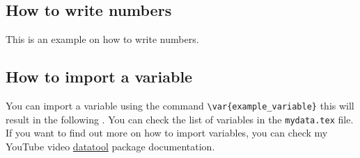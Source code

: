 \subsection{How to write numbers}\label{subsec:how-to-write-numbers}
This is an example on how to write numbers.

\subsection{How to import a variable}\label{subsec:how-to-import-a-variable}
You can import a variable using the command \verb!\var{example_variable}! this will result in the following .
You can check the list of variables in the \texttt{mydata.tex} file.
If you want to find out more on how to import variables, you can check my YouTube video \href{https://ctan.org/pkg/datatool}{datatool} package documentation.